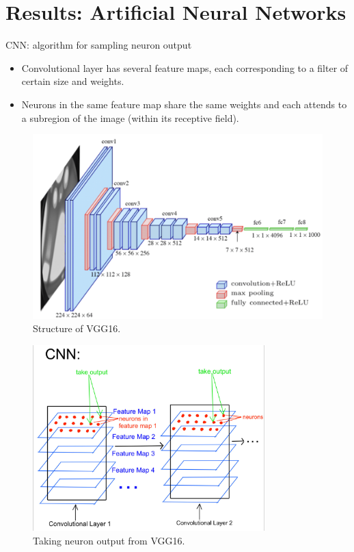 \documentclass[xcolor={dvipsnames,svgnames}]{beamer}
\begin{document}
\section[Results: artificial]{Results: Artificial Neural Networks}

\begin{frame}{CNN: algorithm for sampling neuron output}
\begin{itemize}
    \item Convolutional layer has several feature maps, each corresponding to a filter of certain size and weights. 
    \item Neurons in the same feature map share the same weights and each attends to a subregion of the image (within its receptive field).
\end{itemize}
    \begin{minipage}[t]{.45\linewidth} 
     \begin{figure}[H]
        \centering
            \includegraphics[width=\textwidth]{figures/artificial/vgg16-model.png}
             \caption{Structure of VGG16.}
        \end{figure} 
        \end{minipage}
    \begin{minipage}[t]{.45\linewidth} 
        \begin{figure}
    \includegraphics[width=0.8\textwidth]{figures/artificial/cnn-tensor.jpg}
    \caption{Taking neuron output from VGG16.}
\end{figure}
\end{minipage}
\end{frame}
\end{document}
